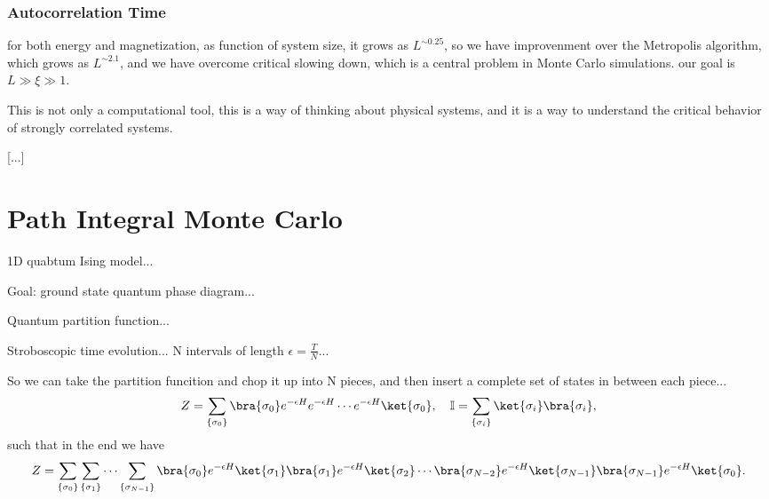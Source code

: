 \subsubsection{Autocorrelation Time}

for both energy and magnetization, as function of system size, it grows as \(L^{\sim 0.25}\), so we have improvenment over the Metropolis algorithm, which grows as \(L^{\sim 2.1}\), and we have overcome critical slowing down, which is a central problem in Monte Carlo simulations. our goal is \(L \gg \xi \gg 1\).

This is not only a computational tool, this is a way of thinking about physical systems, and it is a way to understand the critical behavior of strongly correlated systems.

    [...]

\section{Path Integral Monte Carlo}

1D quabtum Ising model...

Goal: ground state quantum phase diagram...

Quantum partition function...

Stroboscopic time evolution... N intervals of length $\epsilon = \frac{T}{N}$...

So we can take the partition funcition and chop it up into N pieces, and then insert a complete set of states in between each piece...
\[
    Z = \sum_{\{\sigma_0\}} \bra{\sigma_0} e^{-\epsilon H} e^{-\epsilon H} \cdots e^{-\epsilon H} \ket{\sigma_0}, \quad \mathbb{I} = \sum_{\{\sigma_i\}} \ket{\sigma_i}\bra{\sigma_i},
\]
such that in the end we have
\[
    Z = \sum_{\{\sigma_0\}} \sum_{\{\sigma_1\}} \cdots \sum_{\{\sigma_{N-1}\}} \bra{\sigma_0} e^{-\epsilon H} \ket{\sigma_1} \bra{\sigma_1} e^{-\epsilon H} \ket{\sigma_2} \cdots \bra{\sigma_{N-2}} e^{-\epsilon H} \ket{\sigma_{N-1}} \bra{\sigma_{N-1}} e^{-\epsilon H} \ket{\sigma_0}.
\]

